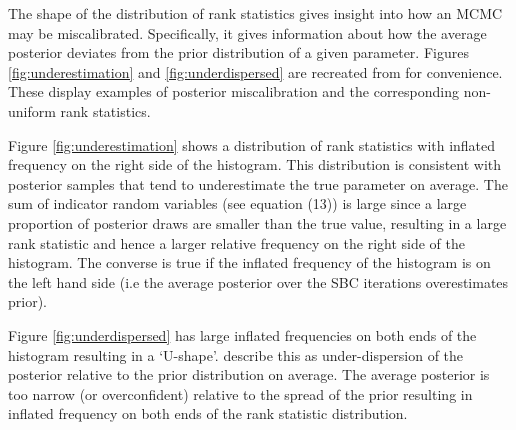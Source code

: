 \documentclass[12pt, a4paper]{article}
\begin{document}
            The shape of the distribution of rank statistics gives insight into how an MCMC may be miscalibrated. Specifically, it gives information about how the average posterior deviates from the prior distribution of a given parameter. Figures \ref{fig:underestimation} and \ref{fig:underdispersed} are recreated from \citet{talts2020validating} for convenience. These display examples of posterior miscalibration and the corresponding non-uniform rank statistics.

            Figure \ref{fig:underestimation} shows a distribution of rank statistics with inflated frequency on the right side of the histogram. This distribution is consistent with posterior samples that tend to underestimate the true parameter on average. The sum of indicator random variables (see equation (13)) is large since a large proportion of posterior draws are smaller than the true value, resulting in a large rank statistic and hence a larger relative frequency on the right side of the histogram. The converse is true if the inflated frequency of the histogram is on the left hand side (i.e the average posterior over the SBC iterations overestimates prior). 

            Figure \ref{fig:underdispersed} has large inflated frequencies on both ends of the histogram resulting in a `U-shape'. \citet{talts2020validating} describe this as under-dispersion of the posterior relative to the prior distribution on average. The average posterior is too narrow (or overconfident) relative to the spread of the prior resulting in inflated frequency on both ends of the rank statistic distribution. 

        
\end{document}
